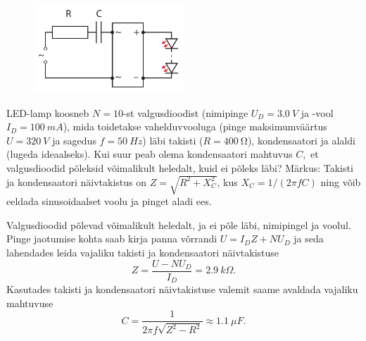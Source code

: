 
\begin{figure}
	\vspace{-24pt}
	\includegraphics[width=0.5\textwidth]{2019-lahg-06-yl.pdf}
\end{figure}

LED-lamp koosneb $N=10$-st valgusdioodist (nimipinge $U_{D}=\SI{3.0}{V}$ ja -vool $I_{D}=\SI{100}{mA}$), mida toidetakse vahelduvvooluga (pinge maksimumväärtus $U=\SI{320}{V}$ ja sagedus $f=\SI{50}{Hz}$) läbi takisti ($R=\SI{400}{\ohm}$), kondensaatori ja alaldi (lugeda ideaalseks). Kui suur peab olema kondensaatori mahtuvus $C,$ et valgusdioodid põleksid võimalikult heledalt, kuid ei põleks läbi? Märkus: Takisti ja kondensaatori näivtakistus on $Z=\sqrt{R^{2}+X_{C}^{2}}$, kus $X_{C}=1/\left(2\pi fC\right)$ ning võib eeldada sinusoidaalset voolu ja pinget aladi ees. 


\hint

\solu
Valgusdioodid põlevad võimalikult heledalt, ja ei põle läbi, nimipingel
ja voolul. Pinge jaotumise kohta saab kirja panna võrrandi $U=I_{D}Z+NU_{D}$
ja seda lahendades leida vajaliku takisti ja kondensaatori näivtakistuse 
\begin{equation*}
Z=\frac{U-NU_{D}}{I_{D}}=\SI{2.9}{k\Omega}.
\end{equation*}
Kasutades takisti ja kondensaatori näivtakistuse valemit saame avaldada
vajaliku mahtuvuse
\begin{equation*}
C=\frac{1}{2\pi f\sqrt{Z^{2}-R^{2}}}\approx\SI{1.1}{\mu F}.
\end{equation*}
\probend